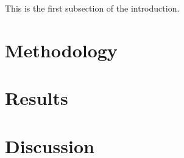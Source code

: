 \documentclass[]{report}
\begin{document}
	This is the first subsection of the introduction.
	\section{Methodology}
	\lipsum
	\section{Results}
	\newpage	
	\section{Discussion}
\end{document}
